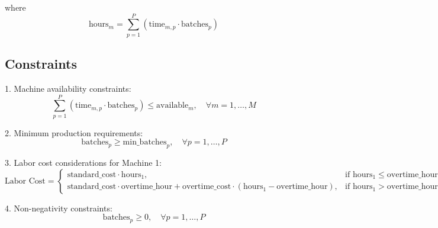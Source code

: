 \documentclass{article}
\begin{document}
where
\[
\text{hours}_{m} = \sum_{p=1}^{P} \left( \text{time}_{m,p} \cdot \text{batches}_{p} \right)
\]

\subsection*{Constraints}
1. Machine availability constraints:
\[
\sum_{p=1}^{P} \left( \text{time}_{m,p} \cdot \text{batches}_{p} \right) \leq \text{available}_{m}, \quad \forall m = 1, \ldots, M
\]

2. Minimum production requirements:
\[
\text{batches}_{p} \geq \text{min\_batches}_{p}, \quad \forall p = 1, \ldots, P
\]

3. Labor cost considerations for Machine 1:
\[
\text{Labor Cost} =
\begin{cases} 
\text{standard\_cost} \cdot \text{hours}_{1}, & \text{if } \text{hours}_{1} \leq \text{overtime\_hour} \\
\text{standard\_cost} \cdot \text{overtime\_hour} + \text{overtime\_cost} \cdot (\text{hours}_{1} - \text{overtime\_hour}), & \text{if } \text{hours}_{1} > \text{overtime\_hour}
\end{cases}
\]

4. Non-negativity constraints:
\[
\text{batches}_{p} \geq 0, \quad \forall p = 1, \ldots, P
\]
\end{document}
